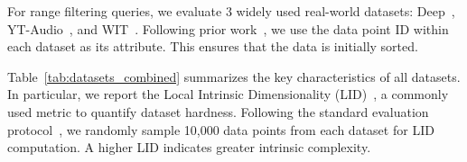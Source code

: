 \documentclass[sigconf, nonacm]{acmart}
\begin{document}
	
	For range filtering queries, we evaluate 3 widely used real-world datasets: Deep~\cite{yandex_deep_dataset}, YT-Audio~\cite{youtube8m_dataset}, and WIT~\cite{wit_dataset}. Following prior work~\cite{DSG}, we use the data point ID within each dataset as its attribute. This ensures that the data is initially sorted.
	
	Table~\ref{tab:datasets_combined} summarizes the key characteristics of all datasets. In particular, we report the Local Intrinsic Dimensionality (LID)~\cite{Lid}, a commonly used metric to quantify dataset hardness. Following the standard evaluation protocol~\cite{LID2}, we randomly sample 10,000 data points from each dataset for LID computation. A higher LID indicates greater intrinsic complexity.
	
	\setlength{\textfloatsep}{0.1cm}
	\setlength{\floatsep}{0cm}
	\begin{table}[t]
		\centering
		
		\setlength{\abovecaptionskip}{0.05cm}
		\setlength{\textfloatsep}{0.cm}
		\caption{Datasets}
		
		\label{tab:datasets_combined}
	\end{table}
	
	
	
\end{document}
